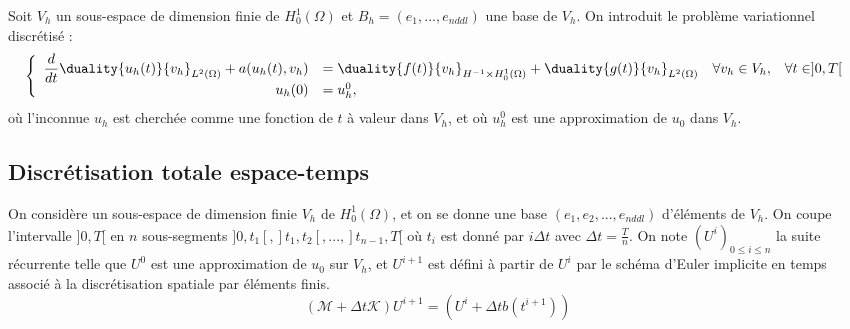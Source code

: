 \documentclass[11pt,a4paper]{article}
\begin{document}
Soit $V_h$ un sous-espace de dimension finie de $H^1_0(\Omega)$ et $B_h = (e_1,...,e_{nddl})$ une base de $V_h$. On introduit le problème variationnel discrétisé :
\begin{equation}\left\{\begin{array}{rlll}
\dfrac{d}{dt}\duality{u_h(t)}{v_h}_{L^2(\Omega)} + a(u_h(t),v_h) &= \duality{f(t)}{v_h}_{H^{-1}\times H^1_{0}(\Omega)}+  \duality{g(t)}{v_h}_{L^2(\Omega)} & \forall v_h \in V_h, & \forall t \in ]0,T[ \\
u_h(0) &= u^0_h,
\end{array}\right.
\label{FormeVaritionnelleDiscrete}
\end{equation}
où l'inconnue $u_h$ est cherchée comme une fonction de $t$ à valeur dans $V_h$, et où $u^0_h$ est une approximation de $u_0$ dans $V_h$.

\subsection{Discrétisation totale espace-temps}

On considère un sous-espace de dimension finie $V_h$ de $H^1_0(\Omega)$, et on se donne une base $(e_1,e_2,...,e_{nddl})$ d'éléments de $V_h$. On coupe l'intervalle $]0,T[$ en $n$ sous-segments $]0,t_1[, ]t_1,t_2[, ..., ]t_{n-1},T[$ où $t_i$ est donné par $i\Delta t$ avec $\Delta t = \frac{T}{n}$. On note $(U^i)_{0 \leq i \leq n}$ la suite récurrente telle que $U^0$ est une approximation de $u_0$ sur $V_h$, et  $U^{i+1}$ est défini à partir de $U^i$ par le schéma d'Euler implicite en temps associé à la discrétisation spatiale par éléments finis. 
\begin{equation}
\left(\mathcal{M} + \Delta t\mathcal{K}\right)U^{i+1} = \left( U^i + \Delta t b(t^{i+1})\right)
\label{SchemaImplicite}
\end{equation}
\end{document}
